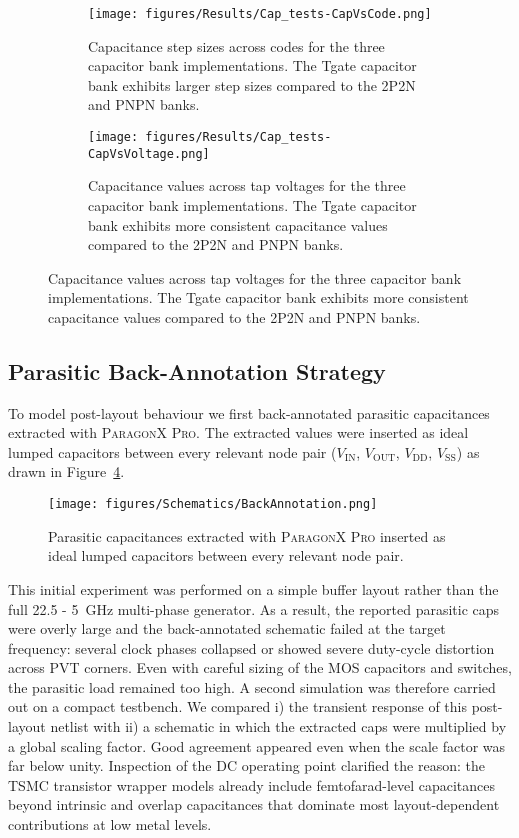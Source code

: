 \begin{figure}[h]
  \begin{subfigure}[t]{0.45\linewidth}
    \centering
    \texttt{[image: figures/Results/Cap\_tests-CapVsCode.png]}
    \caption{Capacitance step sizes across codes for the three capacitor bank implementations. The Tgate capacitor bank exhibits larger step sizes compared to the 2P2N and PNPN banks.}
    \label{fig:cap_vs_codes}
  \end{subfigure}
  \hfill
  \begin{subfigure}[t]{0.45\linewidth}
    \centering
    \texttt{[image: figures/Results/Cap\_tests-CapVsVoltage.png]}
    \caption{Capacitance values across tap voltages for the three capacitor bank implementations. The Tgate capacitor bank exhibits more consistent capacitance values compared to the 2P2N and PNPN banks.}
    \label{fig:cap_vs_tap_voltage}
  \end{subfigure}
\end{figure}

\subsection{Parasitic Back-Annotation Strategy}

To model post-layout behaviour we first back-annotated parasitic capacitances extracted with \textsc{ParagonX Pro}.%
The extracted values were inserted as ideal lumped capacitors between every relevant node pair (\(V_\text{IN}\), \(V_\text{OUT}\), \(V_\text{DD}\), \(V_\text{SS}\)) as drawn in Figure~\ref{fig:back_annotation}.

\begin{figure}[h]
  \centering
  \texttt{[image: figures/Schematics/BackAnnotation.png]}
  \caption{Parasitic capacitances extracted with \textsc{ParagonX Pro} inserted as ideal lumped capacitors between every relevant node pair.}
  \label{fig:back_annotation}
\end{figure}

This initial experiment was performed on a simple buffer layout rather than the full 22.5 - 5~GHz multi-phase generator.
As a result, the reported parasitic caps were overly large and the back-annotated schematic failed at the target frequency: several clock phases collapsed or showed severe duty-cycle distortion across PVT corners.
Even with careful sizing of the MOS capacitors and switches, the parasitic load remained too high.
A second simulation was therefore carried out on a compact testbench.  
We compared i) the transient response of this post-layout netlist with ii) a schematic in which the extracted caps were multiplied by a global scaling factor.  
Good agreement appeared even when the scale factor was far below unity.  
Inspection of the DC operating point clarified the reason: the TSMC transistor wrapper models already include femtofarad-level capacitances beyond intrinsic and overlap capacitances that dominate most layout-dependent contributions at low metal levels.

